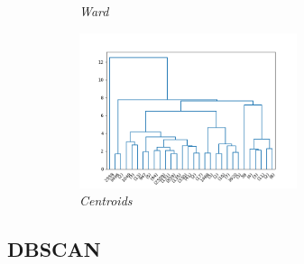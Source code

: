 \begin{figure}
\begin{subfigure}{0.49\textwidth}
        \caption{\emph{Ward}}
        \label{fig:ward_img}
    \end{subfigure}
    \begin{subfigure}{0.49\textwidth}
         \centering
         \includegraphics[width=0.7\textwidth]{img/clust_1/centroid.png}
         \caption{\emph{Centroids}}
         \label{fig:centr_img}
     \end{subfigure}
     \caption{}
    \label{fig:dendograms}
\end{figure}

\subsection{DBSCAN}

